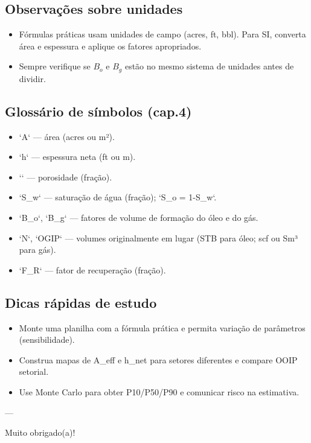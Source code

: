 \documentclass[11pt,a4paper]{article}
\begin{document}
\subsection{Observações sobre unidades}
\begin{itemize}
\item Fórmulas práticas usam unidades de campo (acres, ft, bbl). Para SI, converta área e espessura e aplique os fatores apropriados.
\item Sempre verifique se $B_o$ e $B_g$ estão no mesmo sistema de unidades antes de dividir.
\end{itemize}

\subsection{Glossário de símbolos (cap.4)}
\begin{itemize}
\item `A` — área (acres ou m²).
\item `h` — espessura neta (ft ou m).
\item `\phi` — porosidade (fração).
\item `S_w` — saturação de água (fração); `S_o = 1-S_w`.
\item `B_o`, `B_g` — fatores de volume de formação do óleo e do gás.
\item `N`, `OGIP` — volumes originalmente em lugar (STB para óleo; scf ou Sm³ para gás).
\item `F_R` — fator de recuperação (fração).
\end{itemize}

\subsection{Dicas rápidas de estudo}
\begin{itemize}
\item Monte uma planilha com a fórmula prática e permita variação de parâmetros (sensibilidade).
\item Construa mapas de A_eff e h_net para setores diferentes e compare OOIP setorial.
\item Use Monte Carlo para obter P10/P50/P90 e comunicar risco na estimativa.
\end{itemize}

---

Muito obrigado(a)!

\end{document}
